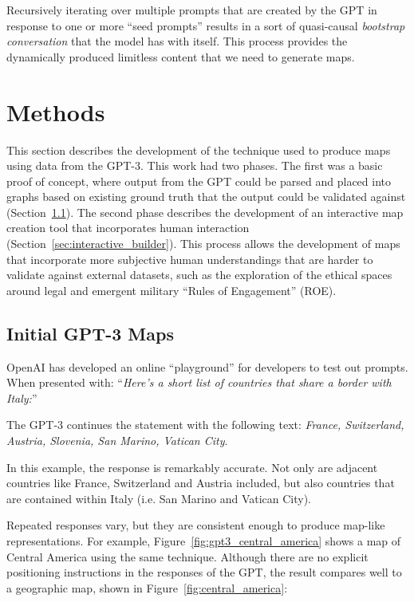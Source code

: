 \documentclass[11pt,dvipdfm]{article}
\begin{document}
Recursively iterating over multiple prompts that are created by the GPT in response to one or more \enquote{seed prompts} results in a sort of quasi-causal \textit{bootstrap conversation} that the model has with itself. This process provides the dynamically produced limitless content that we need to generate maps.

\section{Methods}
\label{sec:methods}
This section describes the development of the technique used to produce maps using data from the GPT-3. This work had two phases. The first was a basic proof of concept, where output from the GPT could be parsed and placed into graphs based on existing ground truth that the output could be validated against (Section~\ref{sec:initial_gpt_maps}). The second phase describes the development of an interactive map creation tool that incorporates human interaction (Section~\ref{sec:interactive_builder}). This process allows the development of maps that incorporate more subjective human understandings that are harder to validate against external datasets, such as the exploration of the ethical spaces around legal and emergent military \enquote{Rules of Engagement} (ROE).

\subsection{Initial GPT-3 Maps}
\label{sec:initial_gpt_maps}

OpenAI has developed an online \enquote{playground} for developers to test out prompts. When presented with: \enquote{\textit{Here's a short list of countries that share a border with Italy:}}

The GPT-3 continues the statement with the following text: \textit{France, Switzerland, Austria, Slovenia,	San Marino, Vatican City}.

In this example, the response is remarkably accurate. Not only are adjacent countries like France, Switzerland and Austria included, but also countries that are contained within Italy (i.e. San Marino and Vatican City).

Repeated responses vary, but they are consistent enough to produce map-like representations. For example, Figure~\ref{fig:gpt3_central_america} shows a map of Central America using the same technique. Although there are no explicit positioning instructions in the responses of the GPT, the result compares well to a geographic map, shown in Figure~\ref{fig:central_america}:
\end{document}
